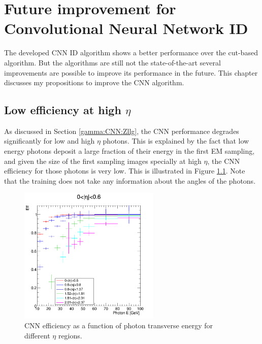 \chapter{Future improvement for Convolutional Neural Network ID}
\label{Adx3}
The developed CNN ID algorithm shows a better performance over the cut-based algorithm. But the algorithms are still not the state-of-the-art several improvements are possible to improve its performance in the future. This chapter discusses my propositions to improve the CNN algorithm.

\section{Low efficiency at high $\eta$}
\label{Adx3:Eta}

As discussed in Section \ref{gamma:CNN:Zllg}, the CNN performance degrades significantly for low \pT and high $\eta$ photons. This is explained by the fact that low energy photons deposit a large fraction of their energy in the first EM sampling, and given the size of the first sampling images specially at high $\eta$, the CNN efficiency for those photons is very low. This is illustrated in Figure \ref{fig:Adx3:Eta}. Note that the training does not take any information about the angles of the photons.
\begin{figure}[htbp]
    \centering
    \includegraphics[width=0.6\textwidth]{Adx/Adx3/Img/Eff_vs_Energy.png}
    \begin{tcolorbox}[colback=black!5!white,colframe=white!75!black]
    \caption{CNN efficiency as a function of photon transverse energy for different $\eta$ regions. }
    \label{fig:Adx3:Eta}
    \end{tcolorbox}
    
\end{figure}

